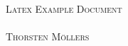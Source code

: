 \begin{titlepage}
\begin{center}
\textsc{\huge Latex Example Document} \\[2cm]
\HRule \\[1cm]
\textsc{\large Thorsten M\"ollers} \\[1cm]
\HRule \\[1cm]
\end{center}
\end{titlepage}